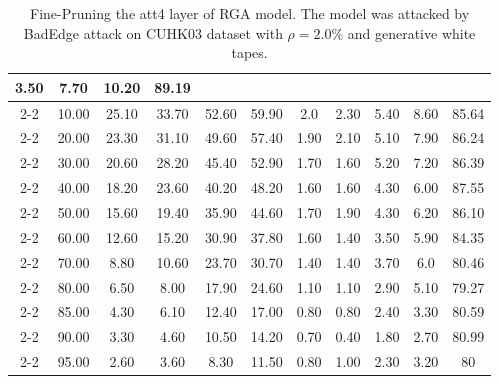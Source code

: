 \begin{table}[htbp]
\begin{minipage}[b]{0.49\linewidth}
{\begin{tabular}{ccccccccccc}
  3.50 &
  7.70 &
  10.20 &
  89.19 \\ \cline{2-2}
\multicolumn{1}{c|}{} & \multicolumn{1}{c|}{10.00} & 25.10 & 33.70 & 52.60 & \multicolumn{1}{c|}{59.90} & 2.0  & 2.30  & 5.40 & 8.60 & 85.64 \\ \cline{2-2}
\multicolumn{1}{c|}{} & \multicolumn{1}{c|}{20.00} & 23.30 & 31.10 & 49.60 & \multicolumn{1}{c|}{57.40} & 1.90  & 2.10  & 5.10 & 7.90 & 86.24 \\ \cline{2-2}
\multicolumn{1}{c|}{} & \multicolumn{1}{c|}{30.00} & 20.60 & 28.20 & 45.40 & \multicolumn{1}{c|}{52.90} & 1.70  & 1.60  & 5.20 & 7.20 & 86.39 \\ \cline{2-2}
\multicolumn{1}{c|}{} & \multicolumn{1}{c|}{40.00} & 18.20 & 23.60 & 40.20 & \multicolumn{1}{c|}{48.20} & 1.60  & 1.60  & 4.30 & 6.00 & 87.55 \\ \cline{2-2}
\multicolumn{1}{c|}{} & \multicolumn{1}{c|}{50.00} & 15.60 & 19.40 & 35.90 & \multicolumn{1}{c|}{44.60} & 1.70  & 1.90  & 4.30 & 6.20 & 86.10 \\ \cline{2-2}
\multicolumn{1}{c|}{} & \multicolumn{1}{c|}{60.00} & 12.60 & 15.20 & 30.90 & \multicolumn{1}{c|}{37.80} & 1.60  & 1.40 & 3.50 & 5.90 & 84.35 \\ \cline{2-2}
\multicolumn{1}{c|}{} & \multicolumn{1}{c|}{70.00} & 8.80 & 10.60 & 23.70 & \multicolumn{1}{c|}{30.70} & 1.40  & 1.40  & 3.70 & 6.0 & 80.46  \\ \cline{2-2}
\multicolumn{1}{c|}{} & \multicolumn{1}{c|}{80.00} & 6.50 & 8.00 & 17.90 & \multicolumn{1}{c|}{24.60} & 1.10  & 1.10  & 2.90 & 5.10 & 79.27 \\ \cline{2-2}
\multicolumn{1}{c|}{} & \multicolumn{1}{c|}{85.00} & 4.30 & 6.10 & 12.40 & \multicolumn{1}{c|}{17.00} & 0.80  & 0.80 & 2.40 & 3.30 & 80.59 \\ \cline{2-2}
\multicolumn{1}{c|}{} & \multicolumn{1}{c|}{90.00} & 3.30 & 4.60 & 10.50 & \multicolumn{1}{c|}{14.20} & 0.70  & 0.40  & 1.80 & 2.70 & 80.99 \\ \cline{2-2}
\multicolumn{1}{c|}{} & \multicolumn{1}{c|}{95.00} & 2.60 & 3.60 & 8.30 & \multicolumn{1}{c|}{11.50} & 0.80  & 1.00  & 2.30 & 3.20 & 80 \\ \bottomrule
\end{tabular}}
  \caption{Fine-Pruning the att4 layer of RGA model. The model was attacked by BadEdge attack on CUHK03 dataset with $\rho=2.0\%$ and generative white tapes. }
  \label{tab:Fine-pruning att4 layer}
\end{minipage}
\end{table}
